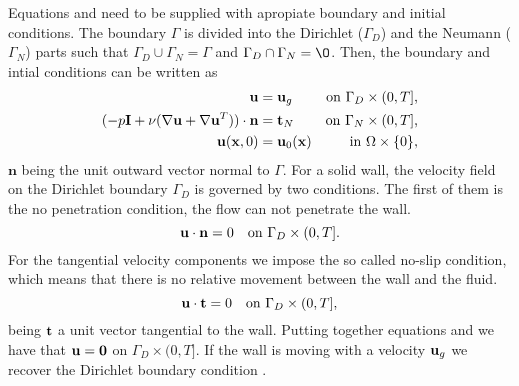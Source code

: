 Equations  and  need to be supplied with apropiate boundary and initial conditions. The boundary $\Gamma$ is divided into the Dirichlet ($\Gamma_D$) and the Neumann ($\Gamma_N$) parts such that $\Gamma_D\cup\Gamma_N=\Gamma$ and $\Gamma_D\cap\Gamma_N=\O$. Then, the boundary and intial conditions can be written as
\begin{align}
\label{eq-NS_strong_Dir}
{\bf u}&={\bf u}_g&\mbox{on $\Gamma_D\times(0,T]$,}\\
\label{eq-NS_strong_Neu}
(-p\mathbf{I}+\nu(\nabla{\bf u}+\nabla{\bf u}^T))\cdot\mathbf{n}&=\mathbf{t}_N&\mbox{on $\Gamma_N\times(0,T]$,}\\
\label{eq-NS_strong_Ini}
{\bf u}({\bf x},0)&={\bf u}_0({\bf x})&\mbox{in $\Omega\times\{0\}$,}
\end{align}
$\mathbf{n}$ being the unit outward vector normal to $\Gamma$. For a solid wall, the velocity field on the Dirichlet boundary $\Gamma_D$ is governed by two conditions. The first of them is the no penetration condition, the flow can not penetrate the wall.
\begin{equation}
\label{eq-NS_no_penetration}
{\bf u}\cdot{\bf n}=0\quad\mbox{on $\Gamma_D\times(0,T]$}.
\end{equation} 
For the tangential velocity components we impose the so called no-slip condition, which means that there is no relative movement between the wall and the fluid.
\begin{equation}
\label{eq-NS_no_slip}
{\bf u}\cdot{\bf t}=0\quad\mbox{on $\Gamma_D\times(0,T]$},
\end{equation}
being ${\bf t}$ a unit vector tangential to the wall. Putting together equations  and  we have that ${\bf u}=\mathbf{0}$ on $\Gamma_D\times(0,T]$. If the wall is moving with a velocity ${\bf u}_g$ we recover the Dirichlet boundary condition .

